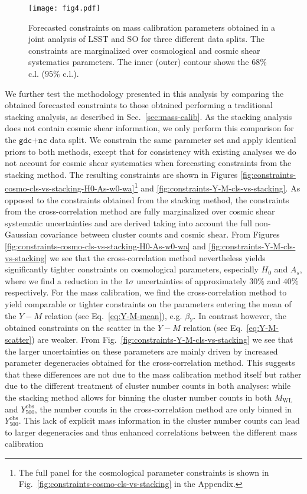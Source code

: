 \documentclass[%
 reprint,
nofootinbib,
 amsmath,amssymb,
 aps,
]{revtex4-1}
\begin{document}
\begin{figure*}
\begin{center}
\texttt{[image: fig4.pdf]}
 \caption{Forecasted constraints on mass calibration parameters obtained in a joint analysis of LSST and SO for three different data splits. The constraints are marginalized over cosmological and cosmic shear systematics parameters. The inner (outer) contour shows the $68 \%$ c.l. ($95 \%$ c.l.).}
\label{fig:constraints-data-splits-Y-M}
\end{center}
\end{figure*}

We further test the methodology presented in this analysis by comparing the obtained forecasted constraints to those obtained performing a traditional stacking analysis, as described in Sec.~\ref{sec:mass-calib}. As the stacking analysis does not contain cosmic shear information, we only perform this comparison for the $\texttt{gdc+nc}$ data split. We constrain the same parameter set and apply identical priors to both methods, except that for consistency with existing analyses we do not account for cosmic shear systematics when forecasting constraints from the stacking method. The resulting constraints are shown in Figures \ref{fig:constraints-cosmo-cls-vs-stacking-H0-As-w0-wa}\footnote{The full panel for the cosmological parameter constraints is shown in Fig.~\ref{fig:constraints-cosmo-cls-vs-stacking} in the Appendix.} and \ref{fig:constraints-Y-M-cls-vs-stacking}. As opposed to the constraints obtained from the stacking method, the constraints from the cross-correlation method are fully marginalized over cosmic shear systematic uncertainties and are derived taking into account the full non-Gaussian covariance between cluster counts and cosmic shear. From Figures \ref{fig:constraints-cosmo-cls-vs-stacking-H0-As-w0-wa} and \ref{fig:constraints-Y-M-cls-vs-stacking} we see that the cross-correlation method nevertheless yields significantly tighter constraints on cosmological parameters, especially $H_{0}$ and $A_{s}$, where we find a reduction in the $1\sigma$ uncertainties of approximately $30\%$ and $40\%$ respectively. For the mass calibration, we find the cross-correlation method to yield comparable or tighter constraints on the parameters entering the mean of the $Y-M$ relation (see Eq.~\ref{eq:Y-M-mean}), e.g. $\beta_{Y}$. In contrast however, the obtained constraints on the scatter in the $Y-M$ relation (see Eq.~\ref{eq:Y-M-scatter}) are weaker. From Fig.~\ref{fig:constraints-Y-M-cls-vs-stacking} we see that the larger uncertainties on these parameters are mainly driven by increased parameter degeneracies obtained for the cross-correlation method. This suggests that these differences are not due to the mass calibration method itself but rather due to the different treatment of cluster number counts in both analyses: while the stacking method allows for binning the cluster number counts in both $M_{\mathrm{WL}}$ and $Y^{\mathrm{obs}}_{500}$, the number counts in the cross-correlation method are only binned in $Y^{\mathrm{obs}}_{500}$. This lack of explicit mass information in the cluster number counts can lead to larger degeneracies and thus enhanced correlations between the different mass calibration 
\end{document}
